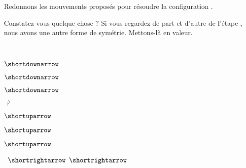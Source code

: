 Redonnons les mouvements proposés pour résoudre la configuration .
\begin{mvts}
	\medskip
	\item  {}
	
	\medskip
	\item  {}
	
	\medskip
	\item  {}
	
	\medskip
	\item  {}
	
	\medskip
	\item  {}
	
	\medskip
	\item  {}
	
	\medskip
	\item  {}
	
	\medskip
	\item  {}
	
	\medskip
	\item  {}
\end{mvts}


Constatez-vous quelque chose ? Si vous regardez de part et d'autre de l'étape , nous avons une autre forme de symétrie. Mettons-là en valeur.
\begin{multicols}{2}
	\medskip {} 
	 \,\,\,\,
	
	\medskip {} 
	 \quad $\shortdownarrow$
	
	\medskip {} 
	 \quad $\shortdownarrow$
	
	\medskip {} 
	 \quad $\shortdownarrow$

	
	\medskip \hfill{} $\Rsh$ \quad {}

	\medskip \hfill{} $\shortuparrow$ \quad {}

	\medskip \hfill{} $\shortuparrow$ \quad {}

	\medskip \hfill{} $\shortuparrow$ \quad {}
\end{multicols}
\vspace{-1em}
\begin{center}
	\medskip {} \, $\shortrightarrow$ \quad {}
	 \quad $\shortrightarrow$ \, 
\end{center}

